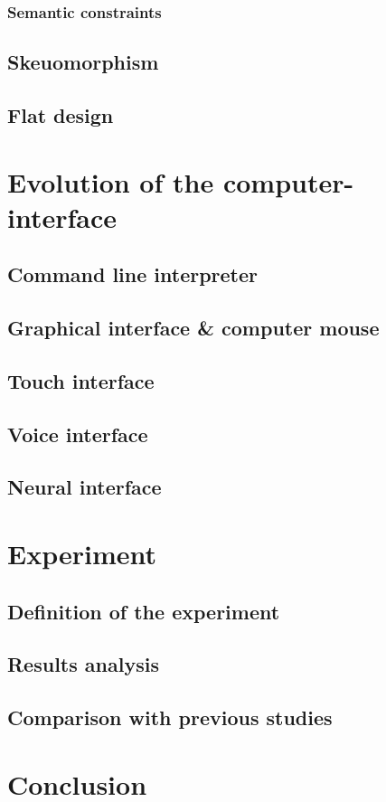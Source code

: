\documentclass[a4paper,11pt] {article}
\theoremstyle{definition}
\begin{document}
\subsubsection{Semantic constraints}
\subsection{Skeuomorphism}
\subsection{Flat design}

\section{Evolution of the computer-interface}
\subsection{Command line interpreter}
\subsection{Graphical interface \& computer mouse}
\subsection{Touch interface}
\subsection{Voice interface}
\subsection{Neural interface}
\section{Experiment}
\subsection{Definition of the experiment}
\subsection{Results analysis}
\subsection{Comparison with previous studies}
\section{Conclusion}
\end{document}
